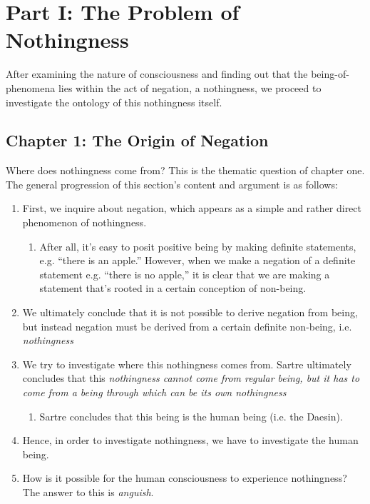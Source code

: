 \chapter{Part I: The Problem of Nothingness}

After examining the nature of consciousness and finding out that the being-of-phenomena lies within the act of negation, a nothingness, we proceed to investigate the ontology of this nothingness itself.

\section{Chapter 1: The Origin of Negation}
Where does nothingness come from? This is the thematic question of chapter one. The general progression of this section's content and argument is as follows:

\begin{enumerate}
  \item First, we inquire about negation, which appears as a simple and rather direct phenomenon of nothingness.
  \begin{enumerate}
    \item After all, it's easy to posit positive being by making definite statements, e.g. \enquote{there is an apple.} However, when we make a negation of a definite statement e.g. \enquote{there is no apple,} it is clear that we are making a statement that's rooted in a certain conception of non-being.
  \end{enumerate}
  \item We ultimately conclude that it is not possible to derive negation from being, but instead negation must be derived from a certain definite non-being, i.e. \emph{nothingness}
  \item We try to investigate where this nothingness comes from. Sartre ultimately concludes that this \emph{nothingness cannot come from regular being, but it has to come from a being through which can be its own nothingness}
  \begin{enumerate}
    \item Sartre concludes that this being is the human being (i.e. the Daesin).
  \end{enumerate}
  \item Hence, in order to investigate nothingness, we have to investigate the human being.
  \item How is it possible for the human consciousness to experience nothingness? The answer to this is \emph{anguish}. 
\end{enumerate}

